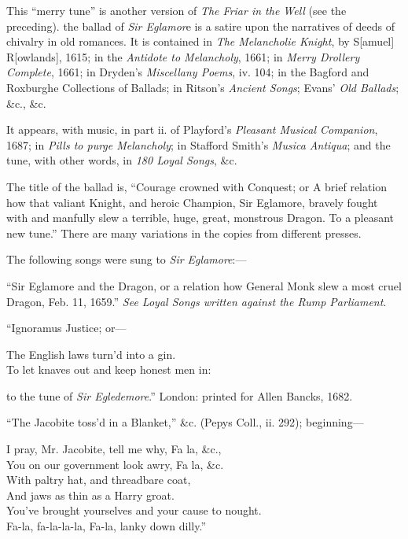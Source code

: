 
This “merry tune” is another version of \textit{The Friar in the Well} (see the preceding). 
the ballad of \textit{Sir Eglamor}e is a satire upon the narratives of deeds
of chivalry in old romances. It is contained in \textit{The Melancholie Knight}, by
S[amuel] R[owlands], 1615; in the \textit{Antidote to Melancholy}, 1661; in \textit{Merry
Drollery Complete}, 1661; in Dryden’s \textit{Miscellany Poems}, iv. 104; in the Bagford
and Roxburghe Collections of Ballads; in Ritson’s \textit{Ancient Songs}; Evans’ \textit{Old
Ballads}; \&c., \&c.

It appears, with music, in part ii. of Playford’s \textit{Pleasant Musical Companion},
1687; in\textit{ Pills to purge Melancholy}; in Stafford Smith’s \textit{Musica Antiqua}; and the
tune, with other words, in \textit{180 Loyal Songs}, \&c.

The title of the ballad is, “Courage crowned with Conquest; or A brief relation
how that valiant Knight, and heroic Champion, Sir Eglamore, bravely fought
with and manfully slew a terrible, huge, great, monstrous Dragon. To a pleasant
new tune.” There are many variations in the copies from different presses.

The following songs were sung to \textit{Sir Eglamore}:—

“Sir Eglamore and the Dragon, or a relation how General Monk slew a most
cruel Dragon, Feb. 11, 1659.” \textit{See Loyal Songs written against the Rump
Parliament}.
\pagebreak

“Ignoramus Justice; or—
\settowidth{\versewidth}{To let knaves out and keep honest men in:}
\begin{scverse}
The English laws turn’d into a gin.\\
To let knaves out and keep honest men in:
\end{scverse}

to the tune of \textit{Sir Egledemore}.” London: printed for Allen Bancks, 1682.

“The Jacobite toss’d in a Blanket,” \&c. (Pepys Coll., ii. 292); beginning—
\settowidth{\versewidth}{You’ve brought yourselves and your cause to nought.}
\begin{scverse}
I pray, Mr. Jacobite, tell me why, Fa la, \&c.,\\
You on our government look awry, Fa la, \&c.\\
With paltry hat, and threadbare coat,\\
And jaws as thin as a Harry groat.\\
You’ve brought yourselves and your cause to nought.\\
Fa-la, fa-la-la-la, Fa-la, lanky down dilly.”
\end{scverse}

